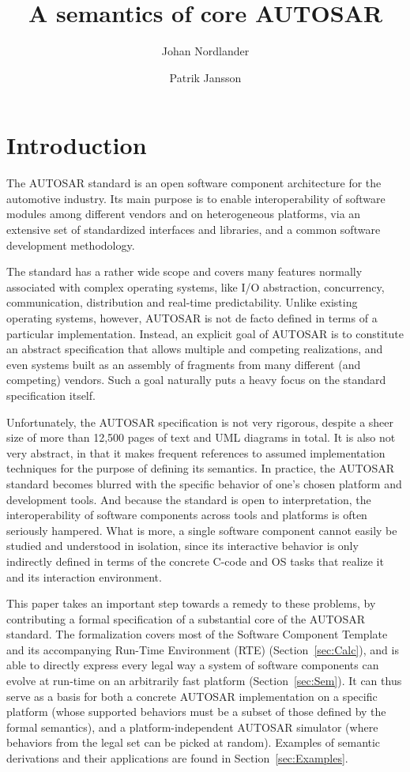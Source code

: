 \documentclass[twocolumn]{article}
\title{A semantics of core AUTOSAR}
\author{Johan Nordlander \and Patrik Jansson}
\begin{document}
\maketitle
\begin{abstract}


\end{abstract}

\section{Introduction}
\label{sec:Intro}

The AUTOSAR standard is an open software component architecture for the automotive industry. Its main purpose is to enable interoperability of software modules among different vendors and on heterogeneous platforms, via an extensive set of standardized interfaces and libraries, and a common software development methodology.

The standard has a rather wide scope and covers many features normally associated with complex operating systems, like I/O abstraction, concurrency, communication, distribution and real-time predictability. Unlike existing operating systems, however, AUTOSAR is not de facto defined in terms of a particular implementation. Instead, an explicit goal of AUTOSAR is to constitute an abstract specification that allows multiple and competing realizations, and even systems built as an assembly of fragments from many different (and competing) vendors. Such a goal naturally puts a heavy focus on the standard specification itself.

Unfortunately, the AUTOSAR specification is not very rigorous, despite a sheer size of more than 12,500 pages of text and UML diagrams in total. It is also not very abstract, in that it makes frequent references to assumed implementation techniques for the purpose of defining its semantics. In practice, the AUTOSAR standard becomes blurred with the specific behavior of one's chosen platform and development tools. And because the standard is open to interpretation, the interoperability of software components across tools and platforms is often seriously hampered. What is more, a single software component cannot easily be studied and understood in isolation, since its interactive behavior is only indirectly defined in terms of the concrete C-code and OS tasks that realize it and its interaction environment.

This paper takes an important step towards a remedy to these problems, by contributing a formal specification of a substantial core of the AUTOSAR standard. The formalization covers most of the Software Component Template and its accompanying Run-Time Environment (RTE) (Section~\ref{sec:Calc}), and is able to directly express every legal way a system of software components can evolve at run-time on an arbitrarily fast platform (Section~\ref{sec:Sem}). It can thus serve as a basis for both a concrete AUTOSAR implementation on a specific platform (whose supported behaviors must be a subset of those defined by the formal semantics), and a platform-independent AUTOSAR simulator (where behaviors from the legal set can be picked at random). Examples of semantic derivations and their applications are found in Section~\ref{sec:Examples}.
\end{document}
